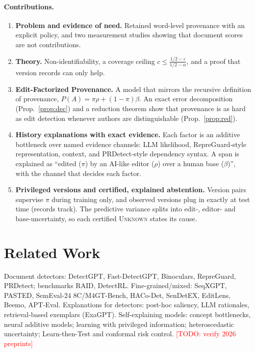 \documentclass[10pt]{article}
\newcommand{\todo}[1]{\textcolor{red}{[TODO: #1]}}
\newcommand{\Unk}{\textsc{Unknown}}
\begin{document}
\paragraph{Contributions.}
\begin{enumerate}
\item \textbf{Problem and evidence of need.} Retained word-level provenance with an explicit policy, and two measurement studies showing that document scores are not contributions.
\item \textbf{Theory.} Non-identifiability, a coverage ceiling $c\le\frac{1/2-\varepsilon}{1/2-\alpha}$, and a proof that version records can only help.
\item \textbf{Edit-Factorized Provenance.} A model that mirrors the recursive definition of provenance, $P(A)=\pi\rho+(1-\pi)\beta$. An exact error decomposition (Prop.~\ref{prop:dec}) and a reduction theorem show that provenance is as hard as edit detection whenever authors are distinguishable (Prop.~\ref{prop:red}).
\item \textbf{History explanations with exact evidence.} Each factor is an additive bottleneck over named evidence channels: LLM likelihood, RepreGuard-style representation, context, and PRDetect-style dependency syntax. A span is explained as ``edited ($\pi$) by an AI-like editor ($\rho$) over a human base ($\beta$)'', with the channel that decides each factor.
\item \textbf{Privileged versions and certified, explained abstention.} Version pairs supervise $\pi$ during training only, and observed versions plug in exactly at test time (records track). The predictive variance splits into edit-, editor- and base-uncertainty, so each certified \Unk{} states its cause.
\end{enumerate}

\section{Related Work}
Document detectors: DetectGPT, Fast-DetectGPT, Binoculars, RepreGuard, PRDetect; benchmarks RAID, DetectRL. Fine-grained/mixed: SeqXGPT, PASTED, SemEval-24 8C/M4GT-Bench, HACo-Det, SenDetEX, EditLens, Beemo, APT-Eval. Explanations for detectors: post-hoc saliency, LLM rationales, retrieval-based exemplars (ExaGPT). Self-explaining models: concept bottlenecks, neural additive models; learning with privileged information; heteroscedastic uncertainty; Learn-then-Test and conformal risk control. \todo{verify 2026 preprints}
\end{document}
